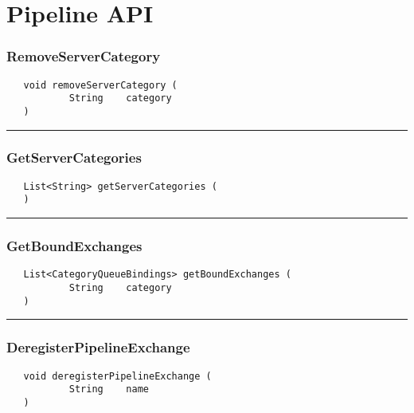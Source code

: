 \chapter{Pipeline API}

\subsection{RemoveServerCategory}
\label{Api:RemoveServerCategory}
\begin{verbatim}
   void removeServerCategory (
           String    category
   )
\end{verbatim}



\rule{15cm}{2pt}
\subsection{GetServerCategories}
\label{Api:GetServerCategories}
\begin{verbatim}
   List<String> getServerCategories (
   )
\end{verbatim}



\rule{15cm}{2pt}
\subsection{GetBoundExchanges}
\label{Api:GetBoundExchanges}
\begin{verbatim}
   List<CategoryQueueBindings> getBoundExchanges (
           String    category
   )
\end{verbatim}



\rule{15cm}{2pt}
\subsection{DeregisterPipelineExchange}
\label{Api:DeregisterPipelineExchange}
\begin{verbatim}
   void deregisterPipelineExchange (
           String    name
   )
\end{verbatim}



